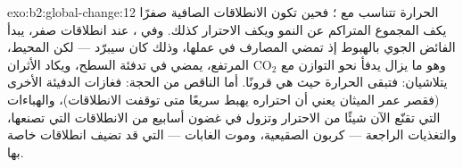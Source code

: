 \begin{solution}{exo:b2:global-change:12}
الحرارة تتناسب مع ؛ فحين
تكون الانطلاقات الصافية صفرًا يكف المجموع المتراكم عن النمو ويكف
الاحترار كذلك. وفي ، عند انطلاقات صفر، يبدأ
الفائض الجوي بالهبوط إذ تمضي المصارف في عملها، وذلك
كان سيبرّد --- لكن المحيط، وهو ما يزال يدفأ نحو التوازن
مع \ensuremath{\mathrm{CO_2}} المرتفع، يمضي في تدفئة
السطح، ويكاد الأثران يتلاشيان: فتبقى الحرارة
حيث هي قرونًا. أما الناقص من الحجة: فغازات الدفيئة
الأخرى (فقصر عمر الميثان يعني أن احتراره
يهبط سريعًا متى توقفت الانطلاقات)، والهباءات التي تقنّع الآن
شيئًا من الاحترار وتزول في غضون أسابيع من الانطلاقات التي تصنعها،
والتغذيات الراجعة --- كربون  الصقيعية، وموت الغابات ---
التي قد تضيف انطلاقات خاصة بها.
\end{solution}

